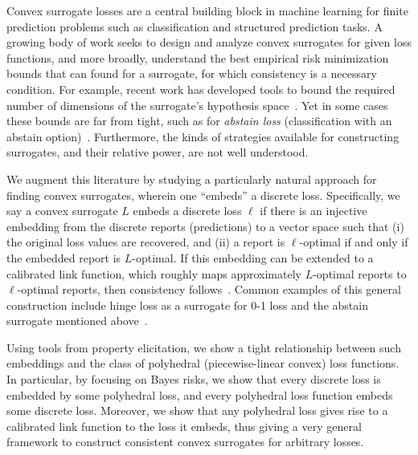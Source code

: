 \documentclass[12pt]{article}
\newcommand{\Comments}{1}
\newcommand{\mynote}[2]{\ifnum\Comments=1\textcolor{#1}{#2}\fi}
\newcommand{\jessie}[1]{\mynote{teal}{[JF: #1]}}
\begin{document}
Convex surrogate losses are a central building block in machine learning for finite prediction problems such as classification and structured prediction tasks.
A growing body of work seeks to design and analyze convex surrogates for given loss functions, and more broadly, understand the best empirical risk minimization bounds that can found for a surrogate, for which consistency is a necessary condition.
For example, recent work has developed tools to bound the required number of dimensions of the surrogate's hypothesis space~\cite{frongillo2015elicitation,  ramaswamy2016convex}.
Yet in some cases these bounds are far from tight, such as for \emph{abstain loss} (classification with an abstain option)~\citep{bartlett2008classification,yuan2010classification,ramaswamy2016convex,ramaswamy2018consistent,zhang2018reject}.
Furthermore, the kinds of strategies available for constructing surrogates, and their relative power, are not well understood.

We augment this literature by studying a particularly natural approach for finding convex surrogates, wherein one ``embeds'' a discrete loss.
Specifically, we say a convex surrogate $L$ embeds a discrete loss $\ell$ if there is an injective embedding from the discrete reports (predictions) to a vector space such that (i) the original loss values are recovered, and (ii) a report is $\ell$-optimal if and only if the embedded report is $L$-optimal.
If this embedding can be extended to a calibrated link function, which roughly maps approximately $L$-optimal reports to $\ell$-optimal reports, then consistency follows~\citep{agarwal2015consistent}.
Common examples of this general construction include hinge loss as a surrogate for 0-1 loss and the abstain surrogate mentioned above~\citep{ramaswamy2018consistent}.

Using tools from property elicitation, we show a tight relationship between such embeddings and the class of polyhedral (piecewise-linear convex) loss functions.
In particular, by focusing on Bayes risks, we show that every discrete loss is embedded by some polyhedral loss, and every polyhedral loss function embeds some discrete loss.
Moreover, we show that any polyhedral loss gives rise to a calibrated link function to the loss it embeds,
thus giving a very general framework to construct consistent convex surrogates for arbitrary losses.

\end{document}
